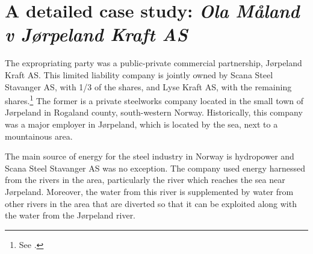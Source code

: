 
\section{A detailed case study: {\it Ola Måland v Jørpeland Kraft AS}}\label{sec:jorpeland}

The expropriating party was a public-private commercial partnership, Jørpeland Kraft AS. This limited liability company is jointly owned by Scana Steel Stavanger AS, with 1/3 of the shares, and Lyse Kraft AS, with the remaining shares.\footnote{See \cite[2]{jorpeland09}.} The former is a private steelworks company located in the small town of Jørpeland in Rogaland county, south-western Norway. Historically, this company was a major employer in Jørpeland, which is located by the sea, next to a mountainous area.

The main source of energy for the steel industry in Norway is hydropower and Scana Steel Stavanger AS was no exception. The company used energy harnessed from the rivers in the area, particularly the river which reaches the sea near Jørpeland. Moreover, the water from this river is supplemented by water from other rivers in the area that are diverted so that it can be exploited along with the water from the Jørpeland river.

